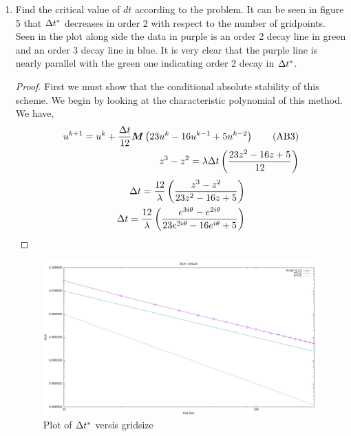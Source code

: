 \documentclass{article}
\begin{document}
\begin{enumerate}[label=\alph*)]
    \item Find the critical value of $dt$ according to the problem. It can be
    seen in figure 5 that $\Delta t^*$ decreases in order 2 with respect to the
    number of gridpoints. Seen in the plot along side the data in purple is an
    order 2 decay line in green and an order 3 decay line in blue. It is very
    clear that the purple line is nearly parallel with the green one indicating
    order 2 decay in $\Delta t^*$. 
        \begin{proof}
            First we must show that the conditional absolute stability of this
            scheme. We begin by looking at the characteristic polynomial of this
            method. We have, 
            \begin{align*}
                u^{k+1} = u^{k} + \frac{\Delta t}{12}\boldsymbol{M}\left(23u^{k} - 16u^{k-1}
                + 5u^{k-2}\right)
                \tag{AB3}\\
                z^3 - z^2 = \lambda\Delta t\left(\frac{23z^2 - 16z + 5}{12}\right)
            \end{align*}   
            \begin{align*}
                \Delta t = \frac{12}{\lambda}\left(\frac{z^3 - z^2}{23z^2 - 16z +
                5}\right)\\
                \Delta t = \frac{12}{\lambda}\left(\frac{e^{3i\theta} -
                e^{2i\theta}}{23e^{2i\theta} - 16e^{i\theta} +
                5}\right)
            \end{align*}
        \end{proof}
        \begin{figure}[ht]
            \centering
            \includegraphics[width=.8\textwidth]{dt.png}
            \caption{Plot of $\Delta t^*$ versis gridsize}
        \end{figure}


\end{enumerate}
\end{document}
